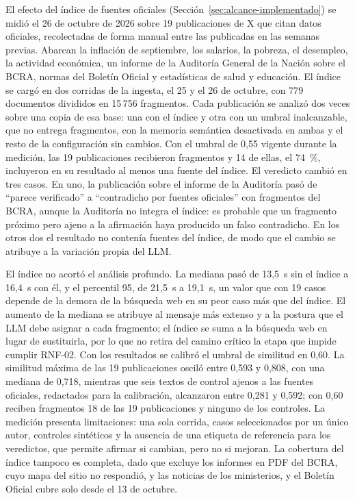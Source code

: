 El efecto del índice de fuentes oficiales (Sección~\ref{sec:alcance-implementado}) se midió el 26 de octubre de 2026 sobre 19 publicaciones de X que citan datos oficiales, recolectadas de forma manual entre las publicadas en las semanas previas. Abarcan la inflación de septiembre, los salarios, la pobreza, el desempleo, la actividad económica, un informe de la Auditoría General de la Nación sobre el BCRA, normas del Boletín Oficial y estadísticas de salud y educación. El índice se cargó en dos corridas de la ingesta, el 25 y el 26 de octubre, con 779 documentos divididos en 15\,756 fragmentos. Cada publicación se analizó dos veces sobre una copia de esa base: una con el índice y otra con un umbral inalcanzable, que no entrega fragmentos, con la memoria semántica desactivada en ambas y el resto de la configuración sin cambios. Con el umbral de 0,55 vigente durante la medición, las 19 publicaciones recibieron fragmentos y 14 de ellas, el 74~\%, incluyeron en su resultado al menos una fuente del índice. El veredicto cambió en tres casos. En uno, la publicación sobre el informe de la Auditoría pasó de \enquote{parece verificado} a \enquote{contradicho por fuentes oficiales} con fragmentos del BCRA, aunque la Auditoría no integra el índice: es probable que un fragmento próximo pero ajeno a la afirmación haya producido un falso contradicho. En los otros dos el resultado no contenía fuentes del índice, de modo que el cambio se atribuye a la variación propia del LLM.

El índice no acortó el análisis profundo. La mediana pasó de 13,5~s sin el índice a 16,4~s con él, y el percentil 95, de 21,5~s a 19,1~s, un valor que con 19 casos depende de la demora de la búsqueda web en su peor caso más que del índice. El aumento de la mediana se atribuye al mensaje más extenso y a la postura que el LLM debe asignar a cada fragmento; el índice se suma a la búsqueda web en lugar de sustituirla, por lo que no retira del camino crítico la etapa que impide cumplir RNF-02. Con los resultados se calibró el umbral de similitud en 0,60. La similitud máxima de las 19 publicaciones osciló entre 0,593 y 0,808, con una mediana de 0,718, mientras que seis textos de control ajenos a las fuentes oficiales, redactados para la calibración, alcanzaron entre 0,281 y 0,592; con 0,60 reciben fragmentos 18 de las 19 publicaciones y ninguno de los controles. La medición presenta limitaciones: una sola corrida, casos seleccionados por un único autor, controles sintéticos y la ausencia de una etiqueta de referencia para los veredictos, que permite afirmar si cambian, pero no si mejoran. La cobertura del índice tampoco es completa, dado que excluye los informes en PDF del BCRA, cuyo mapa del sitio no respondió, y las noticias de los ministerios, y el Boletín Oficial cubre solo desde el 13 de octubre.

